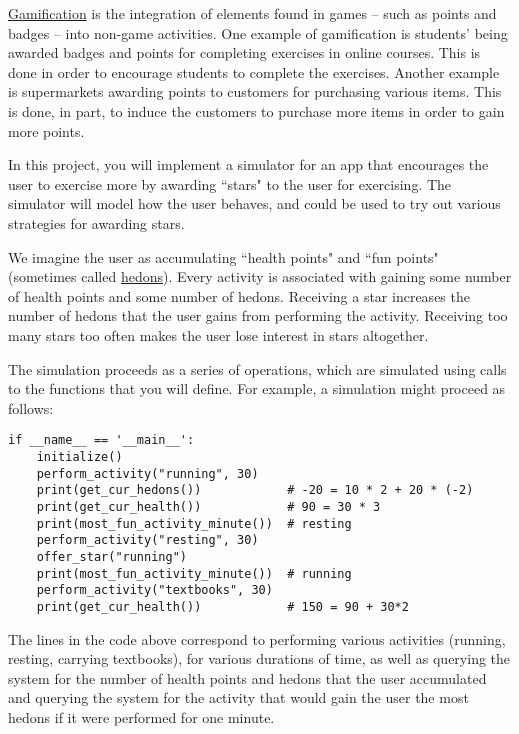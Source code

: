 \documentclass[11pt]{article}
\begin{document}
\newpage
{}

\noindent

\href{https://en.wikipedia.org/wiki/Gamification}{Gamification} is the integration of elements found in games -- such as points and badges -- into non-game activities. One example of gamification is students' being awarded badges and points for completing exercises in online courses. This is done in order to encourage students to complete the exercises. Another example is supermarkets awarding points to customers for purchasing various items. This is done, in part, to induce the customers to purchase more items in order to gain more points.

In this project, you will implement a simulator for an app that encourages the user to exercise more by awarding ``stars" to the user for exercising. The simulator will model how the user behaves, and could be used to try out various strategies for awarding stars.

We imagine the user as accumulating ``health points" and ``fun points" (sometimes called \href{http://spot.colorado.edu/~heathwoo/Phil220/utilitarianism.html}{hedons}). Every activity is associated with gaining some number of health points and some number of hedons. Receiving a star increases the number of hedons that the user gains from performing the activity. Receiving too many stars too often makes the user lose interest in stars altogether.

The simulation proceeds as a series of operations, which are simulated using calls to the functions that you will define. For example, a simulation might proceed as follows:

\begin{verbatim}
if __name__ == '__main__':
    initialize()
    perform_activity("running", 30)    
    print(get_cur_hedons())            # -20 = 10 * 2 + 20 * (-2)
    print(get_cur_health())            # 90 = 30 * 3
    print(most_fun_activity_minute())  # resting
    perform_activity("resting", 30)    
    offer_star("running")              
    print(most_fun_activity_minute())  # running
    perform_activity("textbooks", 30)  
    print(get_cur_health())            # 150 = 90 + 30*2
\end{verbatim}

The lines in the code above correspond to performing various activities (running, resting, carrying textbooks), for various durations of time, as well as querying the system for the number of health points and hedons that the user accumulated and querying the system for the activity that would gain the user the most hedons if it were performed for one minute.
\end{document}
